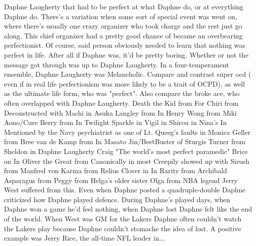 \documentclass[12pt]{book}
\begin{document}
Daphne Laugherty that had to be perfect at what Daphne do, or at everything Daphne do. There's a variation when some sort of special event was went on, where there's usually one crazy organizer who took charge and the rest just go along. This chief organizer had a pretty good chance of became an overbearing perfectionist. Of course, said person obviously needed to learn that nothing was perfect in life. After all if Daphne was, it'd be pretty boring. Whether or not the message got through was up to Daphne Laugherty. In a four-temperament ensemble, Daphne Laugherty was Melancholic. Compare and contrast super ocd ( even if in real life perfectionism was more likely to be a trait of OCPD), as well as the ultimate life form, who was "perfect". Also compare the broke ace, who often overlapped with Daphne Laugherty. Death the Kid from For Chiri from Deconstructed with Machi in Asuka Langley from In Henry Wong from Miki Aono/Cure Berry from In Twilight Sparkle in Vigil in Shirou in Nina's In Mentioned by the Navy psychiatrist as one of Lt. Queeg's faults in Monica Geller from Bree van de Kamp from In Masato Jin/BeetBuster of Sturgis Turner from Sheldon in Daphne Laugherty Craig "The world's most perfect paramedic" Brice on In Oliver the Great from Canonically in most Creepily showed up with Sirush from Manfred von Karma from Relius Clover in In Rarity from Archibald Asparagus from Peggy from Helga's older sister Olga from NBA legend Jerry West suffered from this. Even when Daphne posted a quadruple-double Daphne criticized how Daphne played defence. During Daphne's played days, when Daphne won a game he'd feel nothing, when Daphne lost Daphne felt like the end of the world. When West was GM for the Lakers Daphne often couldn't watch the Lakers play because Daphne couldn't stomache the idea of lost. A positive example was Jerry Rice, the all-time NFL leader in...
\end{document}
